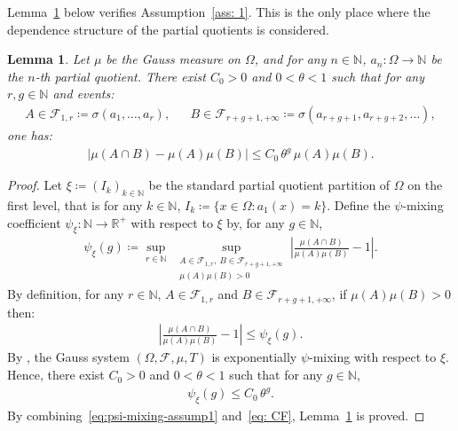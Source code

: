\documentclass[12pt,reqno]{amsart}
\theoremstyle{definition}
\theoremstyle{plain}
\newtheorem{lemma}{Lemma}
\begin{document}
Lemma~\ref{lem: assumption 1} below verifies Assumption~\ref{ass: 1}. 
This is the only place where the dependence structure of the partial quotients is considered.
\begin{lemma}\label{lem: assumption 1}
Let $\mu$ be the Gauss measure on $\Omega$, and for any $n\in\mathbb{N}$, $a_n:\Omega\to\mathbb{N}$ be the $n$-th partial quotient.
There exist $C_0>0$ and $0<\theta<1$ such that for any $r,g\in\mathbb{N}$ and events:
\begin{align*}
    A\in\mathcal{F}_{1,r}\coloneqq\sigma(a_1,\dots,a_r), && B\in\mathcal{F}_{r+g+1,+\infty}\coloneqq\sigma(a_{r+g+1},a_{r+g+2},\dots),
\end{align*}
one has:
\begin{align*}
    |\mu(A\cap B)-\mu(A)\mu(B)|
    \leq C_0\,\theta^{g}\,\mu(A)\mu(B).
\end{align*}
\end{lemma}
\begin{proof}
Let $\xi\coloneqq (I_k)_{k\in\mathbb{N}}$ be the standard partial quotient partition of $\Omega$ on the first level, that is for any $k\in\mathbb{N}$, $I_k\coloneqq\{x\in\Omega:a_1(x)=k\}$. Define the $\psi$-mixing coefficient $\psi_\xi:\mathbb{N}\to\mathbb{R}^+$ with respect to $\xi$ by, for any $g\in\mathbb{N}$,
\begin{align*}
    \psi_\xi{(g)}
    \coloneqq
    \sup_{r\in\mathbb{N}}\ 
    \sup_{\substack{A\in\mathcal F_{1,r},\ B\in\mathcal F_{r+g+1,+\infty}\\ \mu(A)\mu(B)>0}}
    \left|\frac{\mu(A\cap B)}{\mu(A)\mu(B)}-1\right|.
\end{align*}
By definition, for any $r\in\mathbb{N}$, $A\in\mathcal{F}_{1,r}$ and $B\in\mathcal{F}_{r+g+1,+\infty}$, if $\mu(A)\mu(B)>0$ then:
\begin{align}\label{eq:psi-mixing-assump1}
    \left|\frac{\mu(A\cap B)}{\mu(A)\mu(B)}-1\right| \leq \psi_\xi{(g)}.
\end{align}
By \cite[\S 4]{SchindlerZweimueller2023PrimeDigitsCF}, the Gauss system $(\Omega,\mathcal{F},\mu,T)$ is exponentially \(\psi\)-mixing with respect to $\xi$. Hence, there exist $C_0>0$ and $0<\theta<1$ such that for any $g\in\mathbb{N}$,
\begin{align}
\label{eq: CF}
    \psi_\xi(g)\le C_0\,\theta^{g}.
\end{align}
By combining~\eqref{eq:psi-mixing-assump1} and~\eqref{eq: CF}, Lemma~\ref{lem: assumption 1} is proved.
\end{proof}
\end{document}
